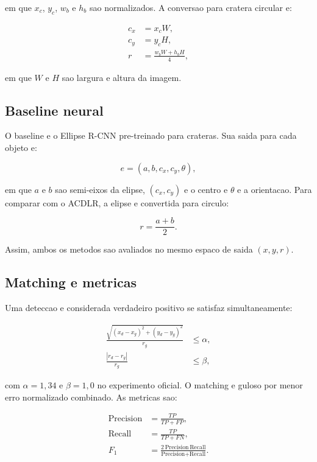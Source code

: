 \documentclass[12pt,a4paper]{article}
\begin{document}
em que $x_c$, $y_c$, $w_b$ e $h_b$ sao normalizados. A conversao para cratera circular e:

\begin{align}
c_x &= x_c W,\\
c_y &= y_c H,\\
r &= \frac{w_b W + h_b H}{4},
\end{align}

em que $W$ e $H$ sao largura e altura da imagem.

\subsection{Baseline neural}

O baseline e o Ellipse R-CNN pre-treinado para crateras. Sua saida para cada objeto e:

\begin{equation}
e = (a,b,c_x,c_y,\theta),
\end{equation}

em que $a$ e $b$ sao semi-eixos da elipse, $(c_x,c_y)$ e o centro e $\theta$ e a orientacao. Para comparar com o ACDLR, a elipse e convertida para circulo:

\begin{equation}
r = \frac{a+b}{2}.
\end{equation}

Assim, ambos os metodos sao avaliados no mesmo espaco de saida $(x,y,r)$.

\subsection{Matching e metricas}

Uma deteccao e considerada verdadeiro positivo se satisfaz simultaneamente:

\begin{align}
\frac{\sqrt{(x_d-x_g)^2 + (y_d-y_g)^2}}{r_g} &\leq \alpha,\\
\frac{|r_d-r_g|}{r_g} &\leq \beta,
\end{align}

com $\alpha=1{,}34$ e $\beta=1{,}0$ no experimento oficial. O matching e guloso por menor erro normalizado combinado. As metricas sao:

\begin{align}
\text{Precision} &= \frac{TP}{TP+FP},\\
\text{Recall} &= \frac{TP}{TP+FN},\\
F_1 &= \frac{2\,\text{Precision}\,\text{Recall}}{\text{Precision}+\text{Recall}}.
\end{align}
\end{document}
